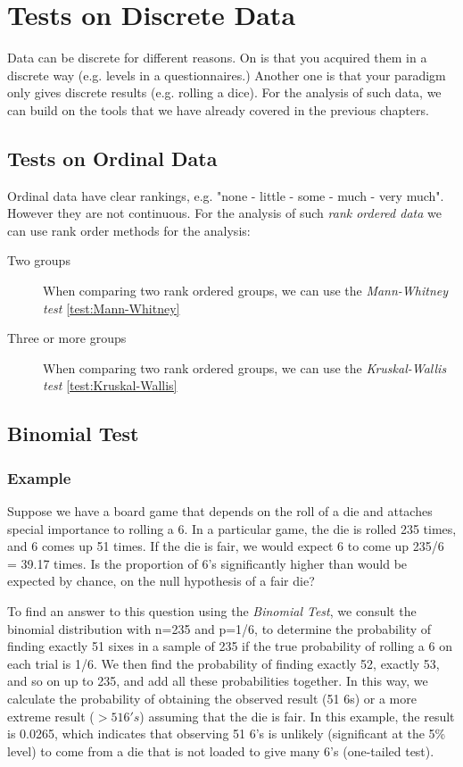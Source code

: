\chapter{Tests on Discrete Data}

Data can be discrete for different reasons. On is that you acquired them in a discrete way (e.g. levels in a questionnaires.) Another one is that your paradigm only gives discrete results (e.g. rolling a dice). For the analysis of such data, we can build on the tools that we have already covered in the previous chapters.

\section{Tests on Ordinal Data}

Ordinal data have clear rankings, e.g. "none - little - some - much - very much". However they are not continuous. For the analysis of such \emph{rank ordered data} we can use rank order methods for the analysis:

\begin{description}
  \item[Two groups] When comparing two rank ordered groups, we can use the \emph{Mann-Whitney test} \ref{test:Mann-Whitney}
  \item[Three or more groups]  When comparing two rank ordered groups, we can use the \emph{Kruskal-Wallis test} \ref{test:Kruskal-Wallis}

\end{description}

\section{Binomial Test}

\subsection{Example}
Suppose we have a board game that depends on the roll of a die and attaches special importance to rolling a 6. In a particular game, the die is rolled 235 times, and 6 comes up 51 times. If the die is fair, we would expect 6 to come up 235/6 = 39.17 times. Is the proportion of 6's significantly higher than would be expected by chance, on the null hypothesis of a fair die?

To find an answer to this question using the \emph{Binomial Test}, we consult the binomial distribution with n=235 and p=1/6, to determine the probability of finding exactly 51 sixes in a sample of 235 if the true probability of rolling a 6 on each trial is 1/6. We then find the probability of finding exactly 52, exactly 53, and so on up to 235, and add all these probabilities together. In this way, we calculate the probability of obtaining the observed result (51 6s) or a more extreme result ($>51 6's$) assuming that the die is fair. In this example, the result is 0.0265, which indicates that observing 51 6's is unlikely (significant at the 5\% level) to come from a die that is not loaded to give many 6's (one-tailed test).

